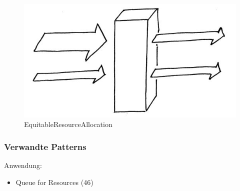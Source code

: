 \begin{figure}[H]
	\centering
	\includegraphics[width=\textwidth]{content/faulttolerance/images/EquitableResourceAllocation.JPG}
	\caption{EquitableResourceAllocation}
\end{figure}


\subsubsection*{Verwandte Patterns}

Anwendung:
\begin{itemize}
	\item Queue for Resources (46)
\end{itemize}


